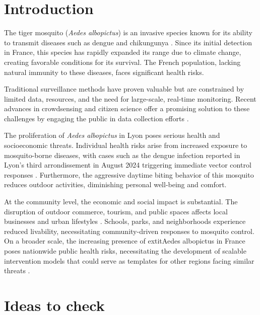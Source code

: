 \documentclass[acmlarge]{acmart}
\begin{document}
\maketitle

\section{Introduction}
The tiger mosquito (\textit{Aedes albopictus}) is an invasive species known for its ability to transmit diseases such as dengue and chikungunya \cite{BONIZZONI2013460}. Since its initial detection in France, this species has rapidly expanded its range due to climate change, creating favorable conditions for its survival. The French population, lacking natural immunity to these diseases, faces significant health risks.

Traditional surveillance methods have proven valuable but are constrained by limited data, resources, and the need for large-scale, real-time monitoring. Recent advances in crowdsensing and citizen science offer a promising solution to these challenges by engaging the public in data collection efforts \cite{Sousa-2022}.

The proliferation of \textit{Aedes albopictus} in Lyon poses serious health and socioeconomic threats. 
Individual health risks arise from increased exposure to mosquito-borne diseases, with cases such as the dengue infection reported in Lyon’s third arrondissement in August 2024 triggering immediate vector control responses \cite{dengue_lyon}. Furthermore, the aggressive daytime biting behavior of this mosquito reduces outdoor activities, diminishing personal well-being and comfort.

At the community level, the economic and social impact is substantial. The disruption of outdoor commerce, tourism, and public spaces affects local businesses and urban lifestyles \cite{haderer:hal-00783873}. Schools, parks, and neighborhoods experience reduced livability, necessitating community-driven responses to mosquito control.
On a broader scale, the increasing presence of 	extit{Aedes albopictus} in France poses nationwide public health risks, necessitating the development of scalable intervention models that could serve as templates for other regions facing similar threats \cite{article}.


\section{Ideas to check}
\end{document}

